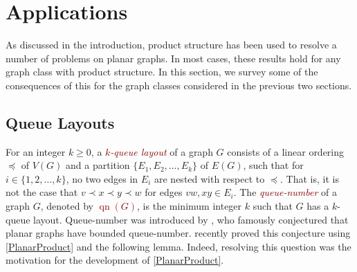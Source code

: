 \documentclass{patmorin}
\theoremstyle{plain}
\theoremstyle{definition}
\newcommand{\defin}[1]{\textcolor{Maroon}{\emph{#1}}}
\newcommand{\note}[2]{\noindent{\color{red}[#1:~#2]}}
\newcommand{\referee}[2]{\noindent\textcolor{blue}{\framebox{\begin{minipage}{\textwidth} Ref \#{#1}: #2\end{minipage}}}}
\DeclareMathOperator{\qn}{qn}
\renewcommand{\geq}{\geqslant}
\begin{document}







\section{Applications}
\label{Applications}

As discussed in the introduction, product structure has been used to resolve a number of problems on planar graphs.  In most cases, these results hold for any graph class with product structure. In this section, we survey some of the consequences of this for the graph classes considered in the previous two sections.

%
%

\subsection{Queue Layouts}

For an integer $k\geq 0$, a \defin{$k$-queue layout} of a graph $G$ consists of a linear ordering $\preceq$ of $V(G)$ and a partition $\{E_1,E_2,\dots,E_k\}$ of $E(G)$, such that for $i\in\{1,2,\dots,k\}$, no two edges in $E_i$ are nested with respect to $\preceq$. That is, it is not the case that $v\prec x \prec y \prec w$ for edges $vw,xy\in E_i$. The \defin{queue-number} of a graph $G$, denoted by \defin{$\qn(G)$}, is the minimum integer $k$ such that $G$ has a $k$-queue layout. Queue-number was introduced by \citet{HLR92}, who famously conjectured that planar graphs have bounded queue-number. \citet{DJMMUW20} recently proved this conjecture using \cref{PlanarProduct} and the following lemma. Indeed, resolving this question was the motivation for the development of \cref{PlanarProduct}.
\end{document}
